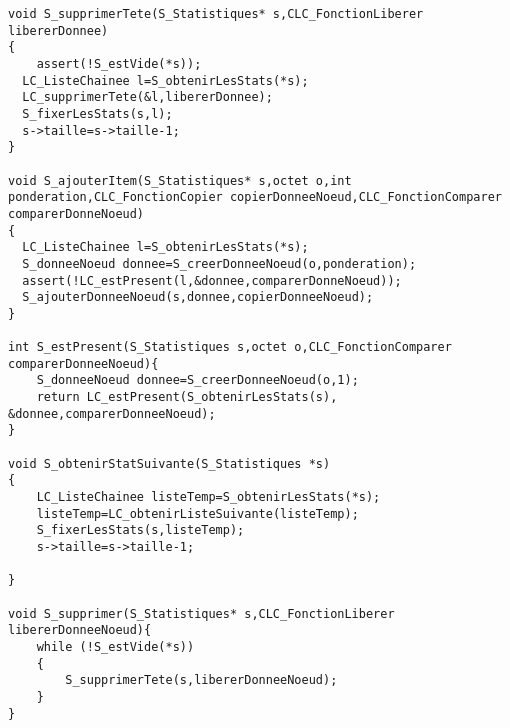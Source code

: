 \begin{verbatim}
void S_supprimerTete(S_Statistiques* s,CLC_FonctionLiberer libererDonnee)
{
	assert(!S_estVide(*s));
  LC_ListeChainee l=S_obtenirLesStats(*s);
  LC_supprimerTete(&l,libererDonnee);
  S_fixerLesStats(s,l);
  s->taille=s->taille-1;
}

void S_ajouterItem(S_Statistiques* s,octet o,int ponderation,CLC_FonctionCopier copierDonneeNoeud,CLC_FonctionComparer comparerDonneNoeud)
{
  LC_ListeChainee l=S_obtenirLesStats(*s);
  S_donneeNoeud donnee=S_creerDonneeNoeud(o,ponderation);
  assert(!LC_estPresent(l,&donnee,comparerDonneNoeud));
  S_ajouterDonneeNoeud(s,donnee,copierDonneeNoeud);
}

int S_estPresent(S_Statistiques s,octet o,CLC_FonctionComparer comparerDonneeNoeud){
	S_donneeNoeud donnee=S_creerDonneeNoeud(o,1);
	return LC_estPresent(S_obtenirLesStats(s), &donnee,comparerDonneeNoeud);
}

void S_obtenirStatSuivante(S_Statistiques *s)
{
	LC_ListeChainee listeTemp=S_obtenirLesStats(*s);
	listeTemp=LC_obtenirListeSuivante(listeTemp);
	S_fixerLesStats(s,listeTemp);
	s->taille=s->taille-1;
	
}

void S_supprimer(S_Statistiques* s,CLC_FonctionLiberer libererDonneeNoeud){
	while (!S_estVide(*s))
	{
		S_supprimerTete(s,libererDonneeNoeud);
	}
}

\end{verbatim}
 
